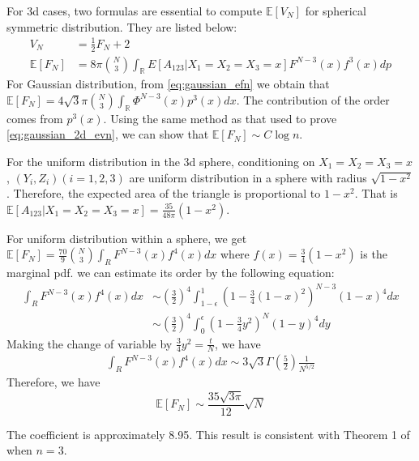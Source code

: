\documentclass{article}
\def\E{\mathbb{E}}
\def\R{\mathbb{R}}
\begin{document}
For 3d cases, two formulas are essential to compute $\E[V_N]$
for spherical symmetric distribution.
They are listed below:
\begin{align}
    V_N &= \frac{1}{2} F_N + 2 \\
    \E[F_N]&=8\pi \binom{N}{3}
    \int_{\R} 
    E[A_{123}|X_1=X_2=X_3=x] F^{N-3}(x)
    f^3(x) dp\label{eq:gaussian_efn}
\end{align}
For Gaussian distribution, from \eqref{eq:gaussian_efn}
we obtain that $\E[F_N]
= 4\sqrt{3}\pi \binom{N}{3}\int_{\R} \Phi^{N-3}(x)p^3(x)dx$.
The contribution of the order comes from $p^3(x)$.
Using the same method as that used to prove \eqref{eq:gaussian_2d_evn},
we can show that
$\E[F_N] \sim C\log n$.

For the uniform
distribution in the 3d sphere, conditioning on $X_1=X_2=X_3=x$,
$(Y_i, Z_i) (i=1,2,3)$
are uniform distribution in a sphere with
radius $\sqrt{1-x^2}$. Therefore, the expected
area of the triangle is proportional to $1-x^2$.
That is
$\E[A_{123}|X_1=X_2=X_3=x] = \frac{35}{48 \pi}(1-x^2)$.

For uniform distribution
within a sphere,
we get
$\E[F_N]
=\frac{70}{9}
\binom{N}{3}
\int_R F^{N-3}(x)f^4(x)dx$
where $f(x)=\frac{3}{4}(1-x^2)$ is the
marginal pdf.
we can estimate its order by
the following equation:
\begin{align*}
    \int_R F^{N-3}(x)f^4(x)dx
    &\sim (\frac{3}{2})^4
    \int_{1-\epsilon}^{1}
    (1-\frac{3}{4}(1-x)^2)^{N-3}
    (1-x)^4dx \\
    &\sim  (\frac{3}{2})^4
    \int_{0}^{\epsilon}
    (1-\frac{3}{4}y^2)^{N}
    (1-y)^4dy
\end{align*}
Making the change of variable by $\frac{3}{4}y^2=\frac{t}{N}$,
we have
\begin{align*}
    \int_R F^{N-3}(x)f^4(x)dx
    \sim 3\sqrt{3}\Gamma(\frac{5}{2})\frac{1}{N^{5/2}}
\end{align*}
Therefore, we have
\begin{equation}\label{eq:3d_uniform_F_N_value}
    \E[F_N] \sim \frac{35\sqrt{3\pi}}{12}\sqrt{N}     
\end{equation}

The coefficient is approximately 8.95.
This result is consistent with
Theorem 1 of \cite{raynaud1970enveloppe}
when $n=3$.
\end{document}
